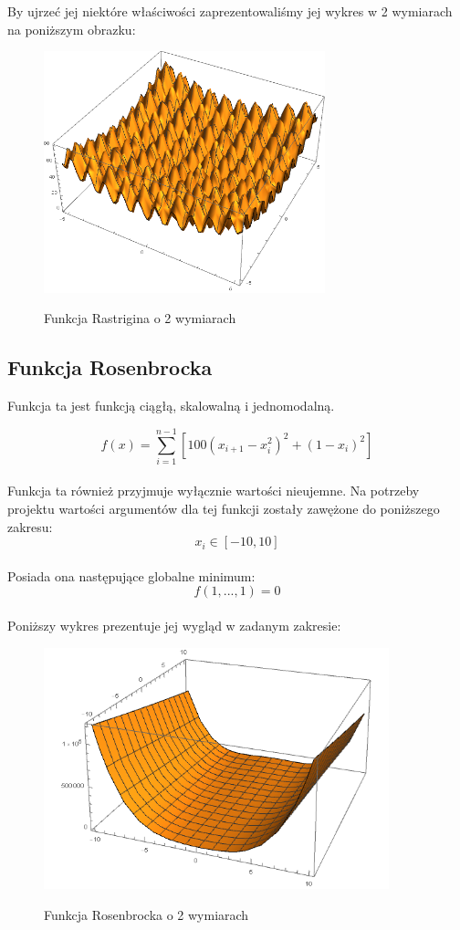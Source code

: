 \documentclass[twoside]{projektInzynierskiMS1}
\newcommand{\si}{ś}
\begin{document}
By ujrzeć jej niektóre wła\si ciwo\si ci zaprezentowali\si my jej wykres w 2 wymiarach na poniższym obrazku:\\
\begin{figure}[H]
	\begin{center}
		\includegraphics[height=7cm]{rastriginFunction1.png}\\
	\end{center}
	\caption{Funkcja Rastrigina o 2 wymiarach}
\end{figure}



	\subsection{Funkcja Rosenbrocka}
Funkcja ta jest funkcją ciągłą, skalowalną i jednomodalną.

\[f(x) = \sum_{i=1}^{n-1} [100(x_{i+1} - x_i^2)^2 + (1- x_i)^2 ]\] \\


Funkcja ta również przyjmuje wyłącznie warto\si ci nieujemne. Na potrzeby projektu warto\si ci argumentów dla tej funkcji zostały zawężone do poniższego zakresu:
\[x_i \in [-10, 10] \] \\

Posiada ona następujące globalne minimum:
\[ f(1,...,1) = 0 \] \\

Poniższy wykres prezentuje jej wygląd w zadanym zakresie:\\
\begin{figure}[H]
	\begin{center}
		\includegraphics[height=7cm]{rosenbrockFunction1.png}\\
	\end{center}
	\caption{Funkcja Rosenbrocka o 2 wymiarach}
\end{figure}
\end{document}
